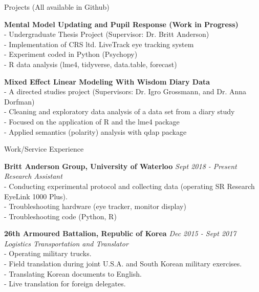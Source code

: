 \documentclass{resume} %
\begin{document}
\begin{rSection}{Projects (All available in Github)}

	{\bf Mental Model Updating and Pupil Response (Work in Progress)}
	\\- Undergraduate Thesis Project (Supervisor: Dr. Britt Anderson)
	\\- Implementation of CRS ltd. LiveTrack eye tracking system
	\\- Experiment coded in Python (Psychopy)
	\\- R data analysis (lme4, tidyverse, data.table, forecast)
	
	{\bf Mixed Effect Linear Modeling With Wisdom Diary Data}
	\\- A directed studies project (Supervisors: Dr. Igro Grossmann, and Dr. Anna Dorfman)
	\\- Cleaning and exploratory data analysis of a data set from a diary study
	\\- Focused on the application of R and the lme4 package
	\\- Applied semantics (polarity) analysis with qdap package

\end{rSection}


\begin{rSection}{Work/Service Experience}

	{\bf Britt Anderson Group, University of Waterloo} \hfill {\em Sept 2018 - Present} 
	\\{\textit{Research Assistant}}
	\\- Conducting experimental protocol and collecting data (operating SR Research EyeLink 1000 Plus).
	\\- Troubleshooting hardware (eye tracker, monitor display)
	\\- Troubleshooting code (Python, R)
	
	
	{\bf 26th Armoured Battalion, Republic of Korea } \hfill {\em Dec 2015 - Sept 2017} 
	\\{\textit{Logistics Transportation and Translator}}
	\\- Operating military trucks.
	\\- Field translation during joint U.S.A. and South Korean military exercises.
	\\- Translating Korean documents to English.
	\\- Live translation for foreign delegates.

\end{rSection}
\end{document}
